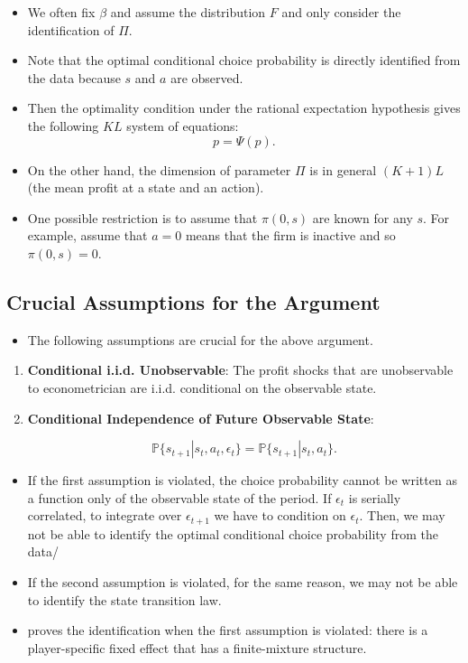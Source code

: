 \documentclass[]{book}
\providecommand{\tightlist}{%
  \setlength{\itemsep}{0pt}\setlength{\parskip}{0pt}}
\begin{document}
\begin{itemize}
\tightlist
\item
  We often fix \(\beta\) and assume the distribution \(F\) and only
  consider the identification of \(\Pi\).
\item
  Note that the optimal conditional choice probability is directly
  identified from the data because \(s\) and \(a\) are observed.
\item
  Then the optimality condition under the rational expectation
  hypothesis gives the following \(KL\) system of equations: \[
  p = \Psi(p).
  \]
\item
  On the other hand, the dimension of parameter \(\Pi\) is in general
  \((K + 1)L\) (the mean profit at a state and an action).
\item
  One possible restriction is to assume that \(\pi(0, s)\) are known for
  any \(s\). For example, assume that \(a = 0\) means that the firm is
  inactive and so \(\pi(0, s) = 0\).
\end{itemize}

\subsection{Crucial Assumptions for the
Argument}\label{crucial-assumptions-for-the-argument}

\begin{itemize}
\tightlist
\item
  The following assumptions are crucial for the above argument.
\end{itemize}

\begin{enumerate}
\def\labelenumi{\arabic{enumi}.}
\tightlist
\item
  \textbf{Conditional i.i.d. Unobservable}: The profit shocks that are
  unobservable to econometrician are i.i.d. conditional on the
  observable state.
\item
  \textbf{Conditional Independence of Future Observable State}:

  \begin{equation}
  \mathbb{P}\{s_{t + 1}|s_t, a_t, \epsilon_t\} = \mathbb{P}\{s_{t + 1}|s_t, a_t\}.
  \end{equation}
\end{enumerate}

\begin{itemize}
\tightlist
\item
  If the first assumption is violated, the choice probability cannot be
  written as a function only of the observable state of the period. If
  \(\epsilon_t\) is serially correlated, to integrate over
  \(\epsilon_{t + 1}\) we have to condition on \(\epsilon_t\). Then, we
  may not be able to identify the optimal conditional choice probability
  from the data/
\item
  If the second assumption is violated, for the same reason, we may not
  be able to identify the state transition law.
\item
  \citet{kasaharaNonparametricIdentificationFinite2009} proves the
  identification when the first assumption is violated: there is a
  player-specific fixed effect that has a finite-mixture structure.
\end{itemize}
\end{document}
